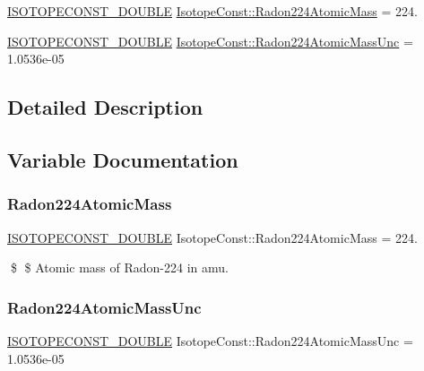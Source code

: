 \begin{DoxyCompactItemize}
\item 
\mbox{\hyperlink{group___isotope_const-_macros_ga8f45a7272ce02c0b4c65c44636ed719a}{I\+S\+O\+T\+O\+P\+E\+C\+O\+N\+S\+T\+\_\+\+D\+O\+U\+B\+LE}} \mbox{\hyperlink{group___isotope_const-_radon-_rn224_ga26d5be8667eaf262fefae28b0b450cb2}{Isotope\+Const\+::\+Radon224\+Atomic\+Mass}} = 224.
\item 
\mbox{\hyperlink{group___isotope_const-_macros_ga8f45a7272ce02c0b4c65c44636ed719a}{I\+S\+O\+T\+O\+P\+E\+C\+O\+N\+S\+T\+\_\+\+D\+O\+U\+B\+LE}} \mbox{\hyperlink{group___isotope_const-_radon-_rn224_gaae09277e31ab424e5af1332f723f4ef0}{Isotope\+Const\+::\+Radon224\+Atomic\+Mass\+Unc}} = 1.\+0536e-\/05
\end{DoxyCompactItemize}


\subsection{Detailed Description}


\subsection{Variable Documentation}
\mbox{\label{group___isotope_const-_radon-_rn224_ga26d5be8667eaf262fefae28b0b450cb2}} 
\subsubsection{\texorpdfstring{Radon224\+Atomic\+Mass}{Radon224AtomicMass}}
{\footnotesize\ttfamily \mbox{\hyperlink{group___isotope_const-_macros_ga8f45a7272ce02c0b4c65c44636ed719a}{I\+S\+O\+T\+O\+P\+E\+C\+O\+N\+S\+T\+\_\+\+D\+O\+U\+B\+LE}} Isotope\+Const\+::\+Radon224\+Atomic\+Mass = 224.}

\$ \$ Atomic mass of Radon-\/224 in amu. \mbox{\label{group___isotope_const-_radon-_rn224_gaae09277e31ab424e5af1332f723f4ef0}} 
\subsubsection{\texorpdfstring{Radon224\+Atomic\+Mass\+Unc}{Radon224AtomicMassUnc}}
{\footnotesize\ttfamily \mbox{\hyperlink{group___isotope_const-_macros_ga8f45a7272ce02c0b4c65c44636ed719a}{I\+S\+O\+T\+O\+P\+E\+C\+O\+N\+S\+T\+\_\+\+D\+O\+U\+B\+LE}} Isotope\+Const\+::\+Radon224\+Atomic\+Mass\+Unc = 1.\+0536e-\/05}

